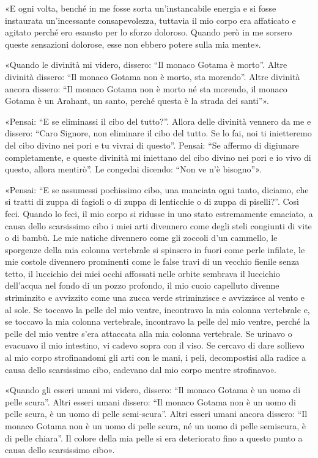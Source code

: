 «E ogni volta, benché in me fosse sorta un’instancabile energia e si fosse
instaurata un’incessante consapevolezza, tuttavia il mio corpo era affaticato e
agitato perché ero esausto per lo sforzo doloroso. Quando però in me sorsero
queste sensazioni dolorose, esse non ebbero potere sulla mia mente».

«Quando le divinità mi videro, dissero: “Il monaco Gotama è morto”. Altre
divinità dissero: “Il monaco Gotama non è morto, sta morendo”. Altre divinità
ancora dissero: “Il monaco Gotama non è morto né sta morendo, il monaco Gotama è
un Arahant, un santo, perché questa è la strada dei santi”».

«Pensai: “E se eliminassi il cibo del tutto?”. Allora delle divinità vennero da
me e dissero: “Caro Signore, non eliminare il cibo del tutto. Se lo fai, noi ti
inietteremo del cibo divino nei pori e tu vivrai di questo”. Pensai: “Se affermo
di digiunare completamente, e queste divinità mi iniettano del cibo divino nei
pori e io vivo di questo, allora mentirò”. Le congedai dicendo: “Non ve n’è
bisogno”».

«Pensai: “E se assumessi pochissimo cibo, una manciata ogni tanto, diciamo, che
si tratti di zuppa di fagioli o di zuppa di lenticchie o di zuppa di piselli?”.
Così feci. Quando lo feci, il mio corpo si ridusse in uno stato estremamente
emaciato, a causa dello scarsissimo cibo i miei arti divennero come degli steli
congiunti di vite o di bambù. Le mie natiche divennero come gli zoccoli d’un
cammello, le sporgenze della mia colonna vertebrale si spinsero in fuori come
perle infilate, le mie costole divennero prominenti come le false travi di un
vecchio fienile senza tetto, il luccichio dei miei occhi affossati nelle orbite
sembrava il luccichio dell’acqua nel fondo di un pozzo profondo, il mio cuoio
capelluto divenne striminzito e avvizzito come una zucca verde striminzisce e
avvizzisce al vento e al sole. Se toccavo la pelle del mio ventre, incontravo la
mia colonna vertebrale e, se toccavo la mia colonna vertebrale, incontravo la
pelle del mio ventre, perché la pelle del mio ventre s’era attaccata alla mia
colonna vertebrale. Se urinavo o evacuavo il mio intestino, vi cadevo sopra con
il viso. Se cercavo di dare sollievo al mio corpo strofinandomi gli arti con le
mani, i peli, decompostisi alla radice a causa dello scarsissimo cibo, cadevano
dal mio corpo mentre strofinavo».

«Quando gli esseri umani mi videro, dissero: “Il monaco Gotama è un uomo di
pelle scura”. Altri esseri umani dissero: “Il monaco Gotama non è un uomo di
pelle scura, è un uomo di pelle semi-scura”. Altri esseri umani ancora dissero:
“Il monaco Gotama non è un uomo di pelle scura, né un uomo di pelle semiscura, è
di pelle chiara”. Il colore della mia pelle si era deteriorato fino a questo
punto a causa dello scarsissimo cibo».


